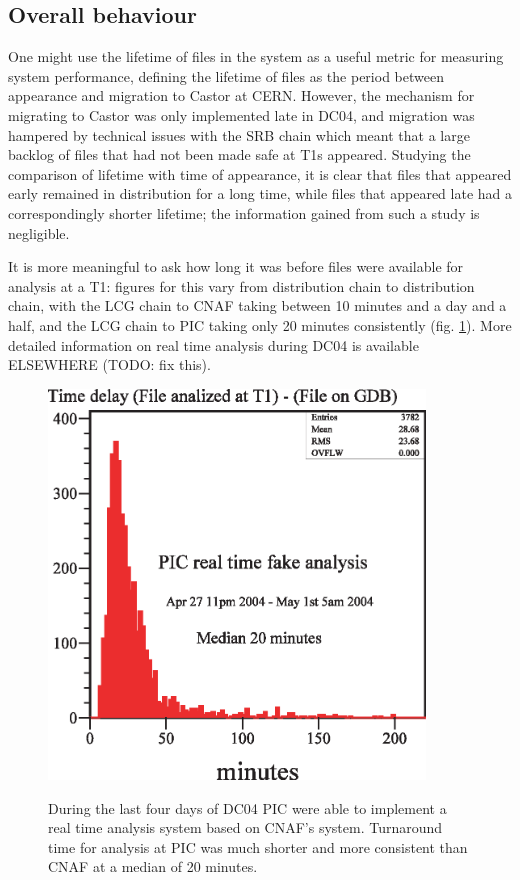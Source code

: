 \documentclass{cmspaper}
\begin{document}
\subsection{Overall behaviour}
One might use the lifetime of files in the system as a useful metric for measuring system performance, defining the lifetime of files as the period between appearance and migration to Castor at CERN. However, the mechanism for migrating to Castor was only implemented late in DC04, and migration was hampered by technical issues with the SRB chain which meant that a large backlog of files that had not been made safe at T1s appeared. Studying the comparison of lifetime with time of appearance, it is clear that files that appeared early remained in distribution for a long time, while files that appeared late had a correspondingly shorter lifetime; the information gained from such a study is negligible.

It is more meaningful to ask how long it was before files were available for analysis at a T1: figures for this vary from distribution chain to distribution chain, with the LCG chain to CNAF taking between 10 minutes and a day and a half, and the LCG chain to PIC taking only 20 minutes consistently (fig. \ref{fig:PIC-RTA}). More detailed information on real time analysis during DC04 is available ELSEWHERE (TODO: fix this).

\begin{figure}[tbp]
\centering
\includegraphics[width=10cm]{PIC-RTA.eps}
\label{fig:PIC-RTA}
\caption{During the last four days of DC04 PIC were able to implement a real time analysis system based on CNAF's system. Turnaround time for analysis at  PIC was much shorter and more consistent than CNAF at a median of 20 minutes.}
\end{figure} 
\end{document}

